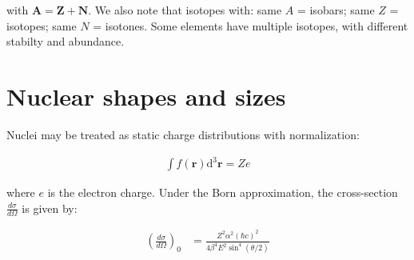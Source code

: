 \documentclass[10pt]{article}
\theoremstyle{definition}
\begin{document}
with $\mathbf{A = Z+N}$. We also note that isotopes with: same $A$ = isobars; same $Z$ = isotopes; same $N$ = isotones. Some elements have multiple isotopes, with different stabilty and abundance.

\section*{Nuclear shapes and sizes}%

Nuclei may be treated as static charge distributions with normalization:

\begin{align}
    \int f(\mathbf{r})\text{d}^3\mathbf{r} = Ze
\end{align}

where $e$ is the electron charge. Under the Born approximation, the cross-section $\frac{d\sigma}{d\Omega}$ is given by:

\begin{align}
    \left(\frac{d\sigma}{d\Omega}\right)_0 &= 
    \frac{Z^2 \alpha^2 (\hbar c)^2}{4\beta^4 E^2 \sin^4(\theta/2)}
\end{align}
\end{document}
